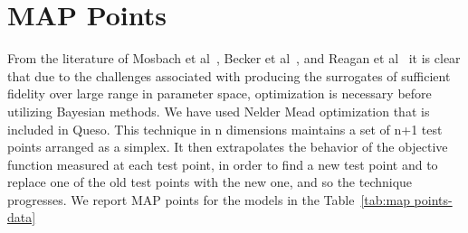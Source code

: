 \section{MAP Points}

From the literature of Mosbach et al~\cite{mosbac}, Becker et al~\cite{Braack}, and Reagan et al~\cite{Reagan} it is clear that  due to the challenges associated with producing the surrogates of sufficient fidelity over large range in parameter space,  optimization  is necessary before utilizing Bayesian methods. We have used Nelder Mead optimization that is included in Queso. This technique in n dimensions maintains a set of n+1 test points arranged as a simplex. It then extrapolates the behavior of the objective function measured at each test point, in order to find a new test point and to replace one of the old test points with the new one, and so the technique progresses. We report MAP points for the models in the Table~\ref{tab:map points-data}

